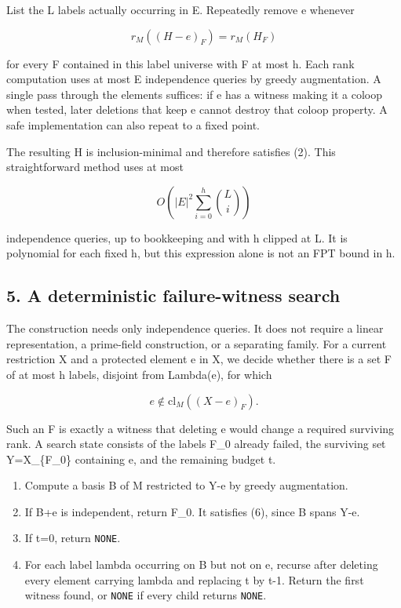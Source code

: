 List the L labels actually occurring in E. Repeatedly remove e whenever

\[
r_M((H-e)_F)=r_M(H_F)
\]

for every F contained in this label universe with \textbar F\textbar{} at most h. Each rank computation uses at most \textbar E\textbar{} independence queries by greedy augmentation. A single pass through the elements suffices: if e has a witness making it a coloop when tested, later deletions that keep e cannot destroy that coloop property. A safe implementation can also repeat to a fixed point.

The resulting H is inclusion-minimal and therefore satisfies (2). This straightforward method uses at most

\[
O\!\left(|E|^2\sum_{i=0}^{h}\binom{L}{i}\right)
\]

independence queries, up to bookkeeping and with h clipped at L. It is polynomial for each fixed h, but this expression alone is not an FPT bound in h.

\hypertarget{af-4c0863a692-a-deterministic-failure-witness-search}{%
\subsection{5. A deterministic failure-witness search}\label{af-4c0863a692-a-deterministic-failure-witness-search}}

The construction needs only independence queries. It does not require a linear representation, a prime-field construction, or a separating family. For a current restriction X and a protected element e in X, we decide whether there is a set F of at most h labels, disjoint from Lambda(e), for which

\[
e\notin\mathrm{cl}_M((X-e)_F). \tag{6}
\]

Such an F is exactly a witness that deleting e would change a required surviving rank. A search state consists of the labels F\_0 already failed, the surviving set Y=X\_\{F\_0\} containing e, and the remaining budget t.

\begin{enumerate}
\def\labelenumi{\arabic{enumi}.}
\tightlist
\item
  Compute a basis B of M restricted to Y-e by greedy augmentation.
\item
  If B+e is independent, return F\_0. It satisfies (6), since B spans Y-e.
\item
  If t=0, return \texttt{NONE}.
\item
  For each label lambda occurring on B but not on e, recurse after deleting every element carrying lambda and replacing t by t-1. Return the first witness found, or \texttt{NONE} if every child returns \texttt{NONE}.
\end{enumerate}

